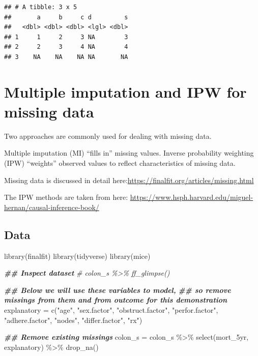 \documentclass[
]{book}
\newenvironment{Shaded}{\begin{snugshade}}{\end{snugshade}}
\newcommand{\CommentTok}[1]{\textcolor[rgb]{0.56,0.35,0.01}{\textit{#1}}}
\newcommand{\DocumentationTok}[1]{\textcolor[rgb]{0.56,0.35,0.01}{\textbf{\textit{#1}}}}
\newcommand{\FunctionTok}[1]{\textcolor[rgb]{0.00,0.00,0.00}{#1}}
\newcommand{\NormalTok}[1]{#1}
\newcommand{\OtherTok}[1]{\textcolor[rgb]{0.56,0.35,0.01}{#1}}
\newcommand{\SpecialCharTok}[1]{\textcolor[rgb]{0.00,0.00,0.00}{#1}}
\newcommand{\StringTok}[1]{\textcolor[rgb]{0.31,0.60,0.02}{#1}}
\begin{document}
\begin{verbatim}
## # A tibble: 3 x 5
##       a     b     c d         s
##   <dbl> <dbl> <dbl> <lgl> <dbl>
## 1     1     2     3 NA        3
## 2     2     3     4 NA        4
## 3    NA    NA    NA NA       NA
\end{verbatim}

\hypertarget{multiple-imputation-and-ipw-for-missing-data}{%
\section{Multiple imputation and IPW for missing data}\label{multiple-imputation-and-ipw-for-missing-data}}

Two approaches are commonly used for dealing with missing data.

Multiple imputation (MI) ``fills in'' missing values. Inverse probability weighting (IPW) ``weights'' observed values to reflect characteristics of missing data.

Missing data is discussed in detail here:\url{https://finalfit.org/articles/missing.html}

The IPW methods are taken from here: \url{https://www.hsph.harvard.edu/miguel-hernan/causal-inference-book/}

\hypertarget{data}{%
\subsection{Data}\label{data}}

\begin{Shaded}
\begin{Highlighting}[]
\FunctionTok{library}\NormalTok{(finalfit)}
\FunctionTok{library}\NormalTok{(tidyverse)}
\FunctionTok{library}\NormalTok{(mice)}

\DocumentationTok{\#\# Inspect dataset}
\CommentTok{\# colon\_s \%\textgreater{}\% ff\_glimpse()}

\DocumentationTok{\#\# Below we will use these variables to model, }
\DocumentationTok{\#\# so remove missings from them and from outcome for this demonstration}
\NormalTok{explanatory }\OtherTok{=} \FunctionTok{c}\NormalTok{(}\StringTok{"age"}\NormalTok{, }
                \StringTok{"sex.factor"}\NormalTok{, }
                \StringTok{"obstruct.factor"}\NormalTok{, }
                \StringTok{"perfor.factor"}\NormalTok{,}
                \StringTok{"adhere.factor"}\NormalTok{,}
                \StringTok{"nodes"}\NormalTok{,}
                \StringTok{"differ.factor"}\NormalTok{,}
                \StringTok{"rx"}\NormalTok{)}


\DocumentationTok{\#\# Remove existing missings}
\NormalTok{colon\_s }\OtherTok{=}\NormalTok{ colon\_s }\SpecialCharTok{\%\textgreater{}\%} 
  \FunctionTok{select}\NormalTok{(mort\_5yr, explanatory) }\SpecialCharTok{\%\textgreater{}\%} 
  \FunctionTok{drop\_na}\NormalTok{()}
\end{Highlighting}
\end{Shaded}
\end{document}
